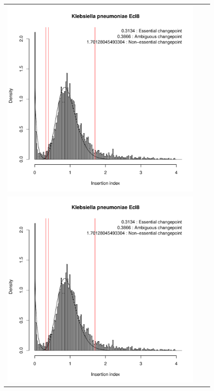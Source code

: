 \documentclass[12pt,letterpaper]{article}
\begin{document}
\begin{figure}
\begin{tabular}{c c c}
\includegraphics[page=3, scale=0.25]{essentiality-normalised.pdf}\\
\includegraphics[page=4, scale=0.25]{essentiality-normalised.pdf}&

\end{tabular}
\end{figure}
\end{document}
